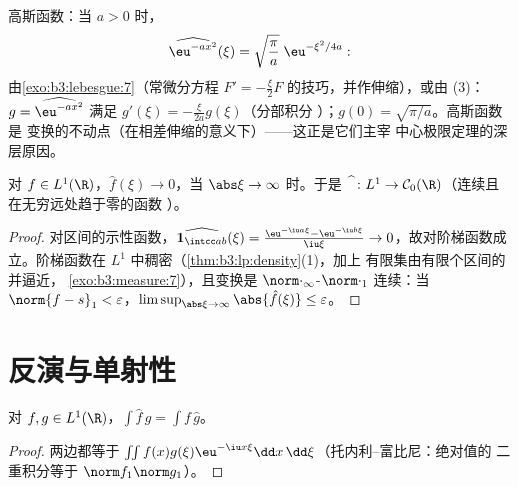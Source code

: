 \begin{example}\label{ex:b3:fouriertransform:gaussian}
高斯函数：当 $a > 0$ 时，
\[
\widehat{\eu^{-ax^2}}(\xi) =
\sqrt{\frac\pi a}\;\eu^{-\xi^2/4a} :
\]
由\cref{exo:b3:lebesgue:7}（常微分方程 $F' = -\frac\xi{2}F$
的技巧，并作伸缩），或由 (3)：$g = \widehat{\eu^{-ax^2}}$
满足 $g'(\xi) = -\frac{\xi}{2a}g(\xi)$（分部积分
）；$g(0) = \sqrt{\pi/a}$。高斯函数是
变换的不动点（在相差伸缩的意义下）——这正是它们主宰
中心极限定理的深层原因。
\end{example}

\begin{theorem}[黎曼–勒贝格引理]
\label{thm:b3:fouriertransform:riemannlebesgue}
对 $f \in L^1(\R)$，$\hat f(\xi) \to 0$，当 $\abs\xi \to
\infty$ 时。于是 $\widehat{\phantom f} \colon L^1 \to \mathcal
C_0(\R)$（连续且在无穷远处趋于零的函数
）。
\end{theorem}

\begin{proof}
对区间的示性函数，$\widehat{\mathbf 1_{\intcc
ab}}(\xi) = \frac{\eu^{-\iu a\xi} - \eu^{-\iu b\xi}}{\iu\xi}
\to 0$，故对阶梯函数成立。阶梯函数在
$L^1$ 中稠密（\cref{thm:b3:lp:density}(1)，加上
有限集由有限个区间的并逼近，
\cref{exo:b3:measure:7}），且变换是
$\norm\cdot_\infty$-$\norm\cdot_1$ 连续：当 $\norm{f -
s}_1 < \varepsilon$，$\limsup_{\abs\xi\to\infty}\abs{\hat
f(\xi)} \leq \varepsilon$。
\end{proof}

\section{反演与单射性}

\begin{lemma}[乘法公式]
\label{lem:b3:fouriertransform:multiplication}
对 $f, g \in L^1(\R)$，$\displaystyle\int \hat f\,g =
\int f\,\hat g$。
\end{lemma}

\begin{proof}
两边都等于 $\iint f(x)g(\xi)\eu^{-\iu x\xi}\dd
x\,\dd\xi$（托内利–富比尼：绝对值的
二重积分等于 $\norm f_1\norm g_1$）。
\end{proof}

